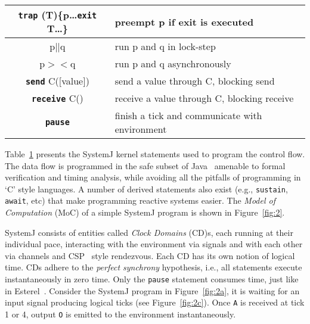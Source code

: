\begin{table}[tb]
\begin{minipage}{8cm}
\begin{scriptsize}
\begin{tabular}{|c|p{80pt}|}
     \textbf{\texttt{trap}} (T)\{p\ldots \textbf{\texttt{exit}} T\ldots\} & preempt p if exit is executed\\                         
     \hline                                                                                     
     p\textbf{\texttt{$||$}}q & run p and q in lock-step\\                                                        
     \hline                                                                                     
     p$><$q & run p and q asynchronously\\                                                      
     \hline                                                                                     
     \textbf{\texttt{send}} C([value]) & send a value through C, blocking
     send\\                                                 
     \hline                                                                                     
     \textbf{\texttt{receive}} C() & receive a value through C, blocking
     receive\\
     \hline                                                                                     
     \textbf{\texttt{pause}} & finish a tick and communicate
     with environment\\
     \hline                                                                                     
   \end{tabular}
  \end{scriptsize}
 \end{minipage}
 \label{tab:1}
\end{table}

Table~\ref{tab:1} presents the SystemJ kernel statements used to program
the control flow. The data flow is programmed in the safe subset of
Java~\cite{scj2013} amenable to formal verification and timing analysis,
while avoiding all the pitfalls of programming in `C' style languages. A
number of derived statements also exist (e.g., \texttt{sustain},
\texttt{await}, etc) that make programming reactive systems easier. The
\textit{Model of Computation} (MoC) of a simple SystemJ program is shown
in Figure~\ref{fig:2}.

SystemJ consists of entities called \textit{Clock Domains} (CD)s, each
running at their individual pace, interacting with the environment via
signals and with each other via channels and CSP~\cite{choa85} style
rendezvous. Each CD has its own notion of logical time. CDs adhere to
the \textit{perfect synchrony} hypothesis, i.e., all statements execute
instantaneously in zero time. Only the \texttt{pause} statement consumes
time, just like in Esterel~\cite{gber931}. Consider the SystemJ program
in Figure~\ref{fig:2a}, it is waiting for an input signal producing
logical ticks (see Figure~\ref{fig:2c}). Once \texttt{A} is received at
tick 1 or 4, output \texttt{O} is emitted to the environment
instantaneously.

